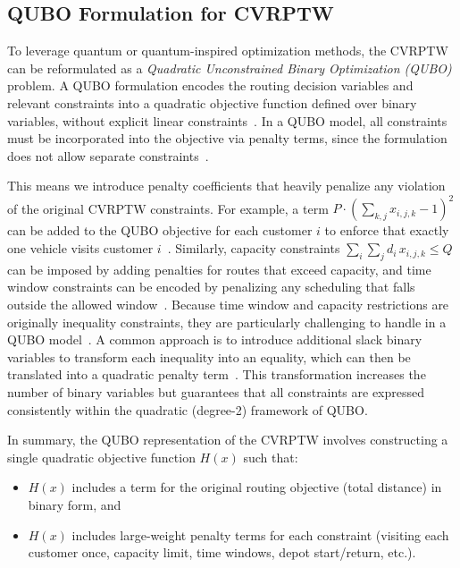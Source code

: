 \documentclass[conference]{IEEEtran}
\begin{document}
\subsection{QUBO Formulation for CVRPTW}

To leverage quantum or quantum-inspired optimization methods, the CVRPTW can be reformulated as a \emph{Quadratic Unconstrained Binary Optimization (QUBO)} problem. A QUBO formulation encodes the routing decision variables and relevant constraints into a quadratic objective function defined over binary variables, without explicit linear constraints~\cite{kochenberger2014}. In a QUBO model, all constraints must be incorporated into the objective via penalty terms, since the formulation does not allow separate constraints~\cite{papalitsas2019}. 

This means we introduce penalty coefficients that heavily penalize any violation of the original CVRPTW constraints. For example, a term 
\(P \cdot ( \sum_{k,j} x_{i,j,k} - 1)^2\) 
can be added to the QUBO objective for each customer \(i\) to enforce that exactly one vehicle visits customer \(i\)~\cite{holliday2025}. Similarly, capacity constraints \(\sum_{i}\sum_{j} d_i\,x_{i,j,k} \le Q\) can be imposed by adding penalties for routes that exceed capacity, and time window constraints can be encoded by penalizing any scheduling that falls outside the allowed window~\cite{borowski2020}. Because time window and capacity restrictions are originally inequality constraints, they are particularly challenging to handle in a QUBO model~\cite{holliday2025}. A common approach is to introduce additional slack binary variables to transform each inequality into an equality, which can then be translated into a quadratic penalty term~\cite{papalitsas2019}. This transformation increases the number of binary variables but guarantees that all constraints are expressed consistently within the quadratic (degree-2) framework of QUBO.

In summary, the QUBO representation of the CVRPTW involves constructing a single quadratic objective function \(H(x)\) such that:

\begin{itemize}
  \item \(H(x)\) includes a term for the original routing objective (total distance) in binary form, and  
  \item \(H(x)\) includes large-weight penalty terms for each constraint (visiting each customer once, capacity limit, time windows, depot start/return, etc.).
\end{itemize}
\end{document}
